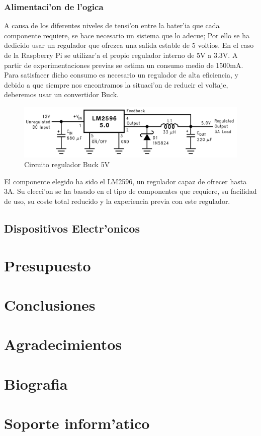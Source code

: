 \documentclass[twoside,12pt]{article}
\begin{document}
\subsubsection{Alimentaci'on de l'ogica}
A causa de los diferentes niveles de tensi'on entre la bater'ia que cada componente requiere, se hace necesario un sistema que lo adecue; Por ello se ha dedicido usar un regulador que ofrezca una salida estable de 5 voltios. En el caso de la Raspberry Pi se utilizar'a el propio regulador interno de 5V a 3.3V.
A partir de experimentaciones previas se estima un consumo medio de 1500mA. Para satisfacer dicho consumo es necesario un regulador de alta eficiencia, y debido a que siempre nos encontramos la situaci'on de reducir el voltaje, deberemos usar un convertidor Buck. 

\begin{figure}[ht]
\centering
\includegraphics[scale=0.35]{images/LM2596.png}
\caption{Circuito regulador Buck 5V}
\label{fig:LM2596}
\end{figure} 

El componente elegido ha sido el LM2596, un regulador capaz de ofrecer hasta 3A. Su elecci'on se ha basado en el tipo de componentes que requiere, su facilidad de uso, su coste total reducido y la experiencia previa con este regulador.



\newpage
\subsection{Dispositivos Electr'onicos}


\newpage

\section{Presupuesto}
\newpage

\section{Conclusiones}
\newpage

\section{Agradecimientos}
\newpage

\section{Biografia}
\newpage

\section{Soporte inform'atico}
\end{document}
